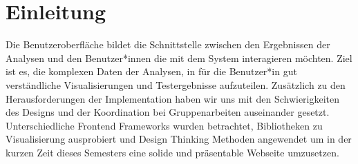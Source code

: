 \section{Einleitung}\label{sec:08_01_einleitung}
Die Benutzeroberfläche bildet die Schnittstelle zwischen den Ergebnissen der Analysen und den Benutzer*innen die mit dem System interagieren möchten. Ziel ist es, die komplexen Daten der Analysen, in für die Benutzer*in gut verständliche Visualisierungen und Testergebnisse aufzuteilen. Zusätzlich zu den Herausforderungen der Implementation haben wir uns mit den Schwierigkeiten des Designs und der Koordination bei Gruppenarbeiten auseinander gesetzt. 
Unterschiedliche Frontend Frameworks wurden betrachtet, Bibliotheken zu Visualisierung ausprobiert und Design Thinking Methoden angewendet um in der kurzen Zeit dieses Semesters eine solide und präsentable Webseite umzusetzen.
